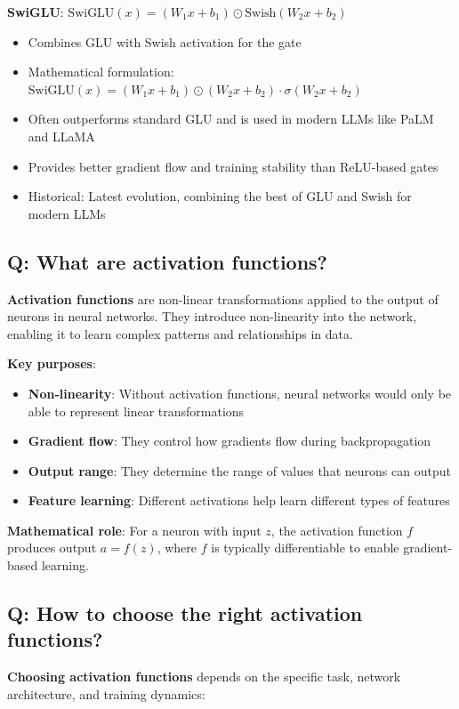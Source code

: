\textbf{SwiGLU}: $\text{SwiGLU}(x) = (W_1x + b_1) \odot \text{Swish}(W_2x + b_2)$
\begin{itemize}
	\item Combines GLU with Swish activation for the gate
	\item Mathematical formulation: $\text{SwiGLU}(x) = (W_1x + b_1) \odot (W_2x + b_2) \cdot \sigma(W_2x + b_2)$
	\item Often outperforms standard GLU and is used in modern LLMs like PaLM and LLaMA
	\item Provides better gradient flow and training stability than ReLU-based gates
	\item Historical: Latest evolution, combining the best of GLU and Swish for modern LLMs
\end{itemize}

\subsection*{\textcolor{primaryteal}{Q: What are activation functions?}}
\textbf{Activation functions} are non-linear transformations applied to the output of neurons in neural networks. They introduce non-linearity into the network, enabling it to learn complex patterns and relationships in data.

\textbf{Key purposes}:
\begin{itemize}
	\item \textbf{Non-linearity}: Without activation functions, neural networks would only be able to represent linear transformations
	\item \textbf{Gradient flow}: They control how gradients flow during backpropagation
	\item \textbf{Output range}: They determine the range of values that neurons can output
	\item \textbf{Feature learning}: Different activations help learn different types of features
\end{itemize}

\textbf{Mathematical role}: For a neuron with input $z$, the activation function $f$ produces output $a = f(z)$, where $f$ is typically differentiable to enable gradient-based learning.

\subsection*{\textcolor{primaryteal}{Q: How to choose the right activation functions?}}
\textbf{Choosing activation functions} depends on the specific task, network architecture, and training dynamics:

